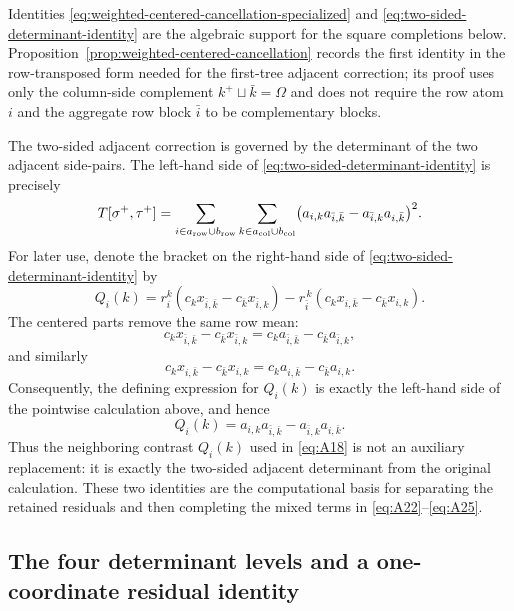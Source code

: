 \documentclass[11pt]{article}
\begin{document}
Identities \eqref{eq:weighted-centered-cancellation-specialized} and
\eqref{eq:two-sided-determinant-identity} are the algebraic support for the
square completions below.
Proposition~\ref{prop:weighted-centered-cancellation} records the first
identity in the row-transposed form needed for the first-tree adjacent
correction; its proof uses only the column-side complement
$k^+\sqcup\bar k=\Omega$ and does not require the row atom $i$ and the
aggregate row block $\bar i$ to be complementary blocks.

The two-sided adjacent correction is governed by the determinant of the
two adjacent side-pairs.  The left-hand side of
\eqref{eq:two-sided-determinant-identity} is precisely
\[
T[\sigma^+,\tau^+]
=\sum_{i\in a_{\rm row}\cup b_{\rm row}}
\sum_{k\in a_{\rm col}\cup b_{\rm col}}
\bigl(a_{i,k}a_{\bar i,\bar k}-a_{\bar i,k}a_{i,\bar k}\bigr)^2.
\]
For later use, denote the bracket on the right-hand side of
\eqref{eq:two-sided-determinant-identity} by
\[
Q_i(k)=
r_i^k(c_kx_{\bar i,\bar k}-c_{\bar k}x_{\bar i,k})
-r_{\bar i}^{\,k}(c_kx_{i,\bar k}-c_{\bar k}x_{i,k}).
\]
The centered parts remove the same row mean:
\[
c_kx_{\bar i,\bar k}-c_{\bar k}x_{\bar i,k}
=c_ka_{\bar i,\bar k}-c_{\bar k}a_{\bar i,k},
\]
and similarly
\[
c_kx_{i,\bar k}-c_{\bar k}x_{i,k}
=c_ka_{i,\bar k}-c_{\bar k}a_{i,k}.
\]
Consequently, the defining expression for $Q_i(k)$ is exactly the left-hand
side of the pointwise calculation above, and hence
\[
Q_i(k)=a_{i,k}a_{\bar i,\bar k}-a_{\bar i,k}a_{i,\bar k}.
\]
Thus the neighboring contrast $Q_i(k)$ used in \eqref{eq:A18} is not an
auxiliary replacement: it is exactly the two-sided adjacent determinant from the
original calculation.  These two identities are the computational basis for
separating the retained residuals and then completing the mixed terms in
\eqref{eq:A22}--\eqref{eq:A25}.


\subsection{The four determinant levels and a one-coordinate residual identity}
\end{document}
